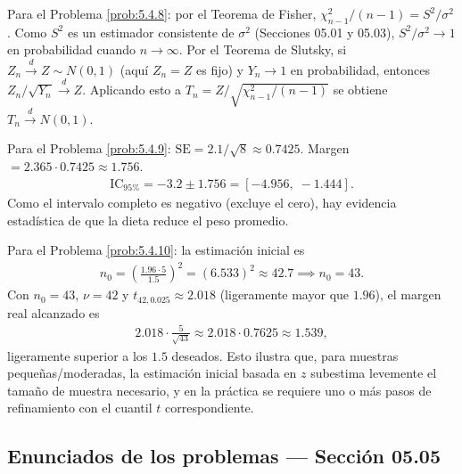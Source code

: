 \begin{solucion}
	\label{sol:5.4.8}
	Para el Problema \ref{prob:5.4.8}: por el Teorema de Fisher, $\chi^2_{n-1}/(n-1) = S^2/\sigma^2$. Como $S^2$ es un estimador consistente de $\sigma^2$ (Secciones 05.01 y 05.03), $S^2/\sigma^2 \to 1$ en probabilidad cuando $n\to\infty$. Por el Teorema de Slutsky, si $Z_n \xrightarrow{d} Z\sim N(0,1)$ (aquí $Z_n=Z$ es fijo) y $Y_n\to 1$ en probabilidad, entonces $Z_n/\sqrt{Y_n} \xrightarrow{d} Z$. Aplicando esto a $T_n = Z/\sqrt{\chi^2_{n-1}/(n-1)}$ se obtiene $T_n \xrightarrow{d} N(0,1)$. \quad \qedhere
\end{solucion}

\begin{solucion}
	\label{sol:5.4.9}
	Para el Problema \ref{prob:5.4.9}: $\text{SE} = 2.1/\sqrt8 \approx 0.7425$. Margen $=2.365\cdot 0.7425\approx 1.756$.
	\begin{align*}
		\text{IC}_{95\%} = -3.2 \pm 1.756 = [-4.956,\; -1.444].
	\end{align*}
	Como el intervalo completo es negativo (excluye el cero), hay evidencia estadística de que la dieta reduce el peso promedio. \quad \qedhere
\end{solucion}

\begin{solucion}
	\label{sol:5.4.10}
	Para el Problema \ref{prob:5.4.10}: la estimación inicial es
	\begin{align*}
		n_0 = \left(\frac{1.96\cdot 5}{1.5}\right)^2 = (6.533)^2 \approx 42.7 \implies n_0 = 43.
	\end{align*}
	Con $n_0=43$, $\nu=42$ y $t_{42,0.025}\approx 2.018$ (ligeramente mayor que $1.96$), el margen real alcanzado es
	\begin{align*}
		2.018\cdot\frac{5}{\sqrt{43}} \approx 2.018\cdot 0.7625 \approx 1.539,
	\end{align*}
	ligeramente superior a los $1.5$ deseados. Esto ilustra que, para muestras pequeñas/moderadas, la estimación inicial basada en $z$ subestima levemente el tamaño de muestra necesario, y en la práctica se requiere uno o más pasos de refinamiento con el cuantil $t$ correspondiente. \quad \qedhere
\end{solucion}


\subsection*{Enunciados de los problemas --- Sección 05.05}

